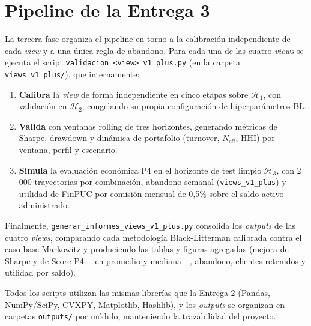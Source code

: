 \section{Pipeline de la Entrega 3}

La tercera fase organiza el pipeline en torno a la calibraci\'on independiente
de cada \textit{view} y a una \'unica regla de abandono. Para cada una de las
cuatro \textit{views} se ejecuta el script
\texttt{validacion\_<view>\_v1\_plus.py} (en la carpeta
\texttt{views\_v1\_plus/}), que internamente:

\begin{enumerate}
    \item \textbf{Calibra} la \textit{view} de forma independiente en cinco
    etapas sobre $\mathcal{H}_1$, con validaci\'on en $\mathcal{H}_2$,
    congelando su propia configuraci\'on de hiperpar\'ametros BL.

    \item \textbf{Valida} con ventanas rolling de tres horizontes, generando
    m\'etricas de Sharpe, drawdown y din\'amica de portafolio (turnover,
    $N_{\text{eff}}$, HHI) por ventana, perfil y escenario.

    \item \textbf{Simula} la evaluaci\'on econ\'omica P4 en el horizonte de test
    limpio $\mathcal{H}_3$, con 2\,000 trayectorias por combinaci\'on, abandono
    semanal (\texttt{views\_v1\_plus}) y utilidad de FinPUC por comisi\'on
    mensual de 0,5\% sobre el saldo activo administrado.
\end{enumerate}

Finalmente, \texttt{generar\_informes\_views\_v1\_plus.py} consolida los
\textit{outputs} de las cuatro \textit{views}, comparando cada metodolog\'ia
Black-Litterman calibrada contra el caso base Markowitz y produciendo las
tablas y figuras agregadas (mejora de Sharpe y de Score P4 ---en promedio y
mediana---, abandono, clientes retenidos y utilidad por saldo).

Todos los scripts utilizan las mismas librer\'ias que la Entrega 2 (Pandas,
NumPy/SciPy, CVXPY, Matplotlib, Hashlib), y los \textit{outputs} se organizan en
carpetas \texttt{outputs/} por m\'odulo, manteniendo la trazabilidad del
proyecto.
